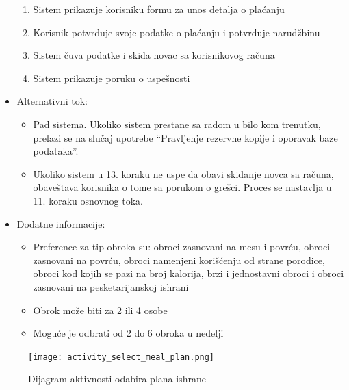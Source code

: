 \begin{itemize}
\begin{enumerate}
            \item Sistem prikazuje korisniku formu za unos detalja o plaćanju
            \item Korisnik potvrđuje svoje podatke o plaćanju i potvrđuje narudžbinu
            \item Sistem čuva podatke i skida novac sa korisnikovog računa
            \item Sistem prikazuje poruku o uspešnosti 
        \end{enumerate}
    \item Alternativni tok:
        \begin{itemize}
            \item Pad sistema. Ukoliko sistem prestane sa radom u bilo kom trenutku, prelazi se na slučaj upotrebe ``Pravljenje rezervne kopije i oporavak baze podataka''.
            \item Ukoliko sistem u 13. koraku ne uspe da obavi skidanje novca sa računa, obaveštava korisnika o tome sa porukom o grešci. Proces se nastavlja u 11. koraku osnovnog toka.
        \end{itemize}
    \item Dodatne informacije:
        \begin{itemize}
            \item Preference za tip obroka su: obroci zasnovani na mesu i povrću, obroci zasnovani na povrću, obroci namenjeni korišćenju od strane porodice, obroci kod kojih se pazi na broj kalorija, brzi i jednostavni obroci i obroci zasnovani na pesketarijanskoj ishrani 
            \item Obrok može biti za 2 ili 4 osobe
            \item Moguće je odbrati od 2 do 6 obroka u nedelji
        \end{itemize}
\end{itemize}

\begin{figure}[H]
\begin{center}
\texttt{[image: activity\_select\_meal\_plan.png]}
\end{center}
    \caption{Dijagram aktivnosti odabira plana ishrane}
\label{fig:ActivitySelectMealPlanProfile}
\end{figure}
